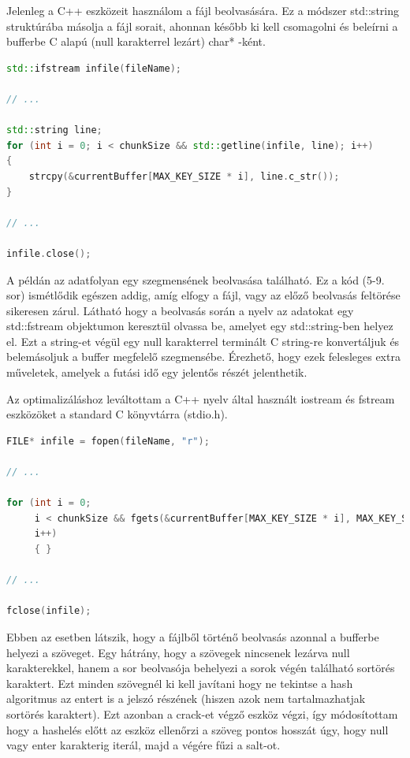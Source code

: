 Jelenleg a C++ eszközeit használom a fájl beolvasására. Ez a módszer std::string struktúrába másolja a fájl sorait, ahonnan később ki kell csomagolni és beleírni a bufferbe C alapú (null karakterrel lezárt) char* -ként.


\begin{lstlisting}[language={C++}]
std::ifstream infile(fileName);

// ...

std::string line;
for (int i = 0; i < chunkSize && std::getline(infile, line); i++)
{
    strcpy(&currentBuffer[MAX_KEY_SIZE * i], line.c_str());
}

// ...

infile.close();
\end{lstlisting}


A példán az adatfolyan egy szegmensének beolvasása található. Ez a kód (5-9. sor) ismétlődik egészen addig, amíg elfogy a fájl, vagy az előző beolvasás feltörése sikeresen zárul. Látható hogy a beolvasás során a nyelv az adatokat egy std::fstream objektumon keresztül olvassa be, amelyet egy std::string-ben helyez el. Ezt a string-et végül egy null karakterrel terminált C string-re konvertáljuk és belemásoljuk a buffer megfelelő szegmensébe. Érezhető, hogy ezek felesleges extra műveletek, amelyek a futási idő egy jelentős részét jelenthetik.

Az optimalizáláshoz leváltottam a C++ nyelv által használt iostream és fstream eszközöket a standard C könyvtárra (stdio.h).

\begin{lstlisting}[language={C}]
FILE* infile = fopen(fileName, "r");

// ...

for (int i = 0;
     i < chunkSize && fgets(&currentBuffer[MAX_KEY_SIZE * i], MAX_KEY_SIZE, infile) != NULL;
     i++)
     { }

// ...

fclose(infile);
\end{lstlisting}


Ebben az esetben látszik, hogy a fájlből történő beolvasás azonnal a bufferbe helyezi a szöveget. Egy hátrány, hogy a szövegek nincsenek lezárva null karakterekkel, hanem a sor beolvasója behelyezi a sorok végén található sortörés karaktert. Ezt minden szövegnél ki kell javítani hogy ne tekintse a hash algoritmus az entert is a jelszó részének (hiszen azok nem tartalmazhatjak sortörés karaktert). Ezt azonban a crack-et végző eszköz végzi, így módosítottam hogy a hashelés előtt az eszköz ellenőrzi a szöveg pontos hosszát úgy, hogy null vagy enter karakterig iterál, majd a végére fűzi a salt-ot.


